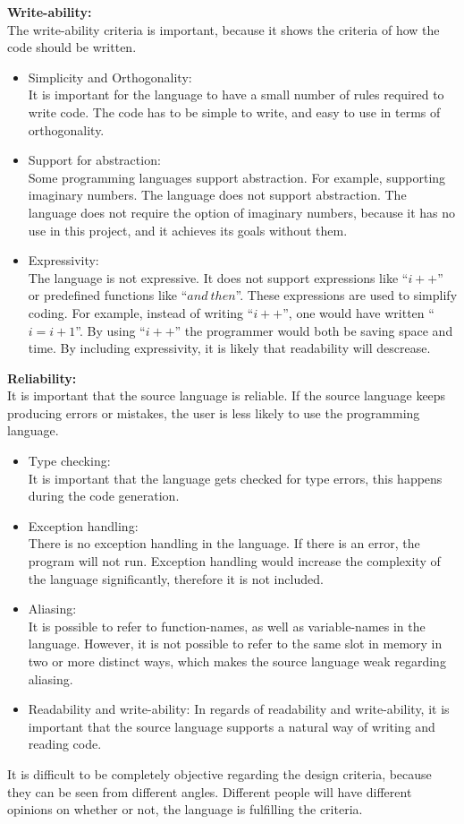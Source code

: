 \textbf{Write-ability:} \\
The write-ability criteria is important, because it shows the criteria of how the code should be written. 
\begin{itemize}
\item Simplicity and Orthogonality: \\
It is important for the language to have a small number of rules required to write code. The code has to be simple to write, and easy to use in terms of orthogonality.
\item Support for abstraction: \\
Some programming languages support abstraction. For example, supporting imaginary numbers. The language does not support abstraction. The language does not require the option of imaginary numbers, because it has no use in this project, and it achieves its goals without them.
\item Expressivity: \\
The language is not expressive. It does not support expressions like ``$i++$'' or predefined functions like ``$and~then$''. These expressions are used to simplify coding. For example, instead of writing ``$i++$'', one would have written ``$i = i + 1$''. By using ``$i++$'' the programmer would both be saving space and time. By including expressivity, it is likely that readability will descrease. 
\end{itemize}
\textbf{Reliability:} \\
It is important that the source language is reliable. If the source language keeps producing errors or mistakes, the user is less likely to use the programming language.
\begin{itemize}
\item Type checking: \\
It is important that the language gets checked for type errors, this happens during the code generation.
\item Exception handling: \\
There is no exception handling in the language. If there is an error, the program will not run. Exception handling would increase the complexity of the language significantly, therefore it is not included.
\item Aliasing: \\
It is possible to refer to function-names, as well as variable-names in the language. However, it is not possible to refer to the same slot in memory in two or more distinct ways, which makes the source language weak regarding aliasing. 
\item Readability and write-ability:
In regards of readability and write-ability, it is important that the source language supports a natural way of writing and reading code. 
\end{itemize}
It is difficult to be completely objective regarding the design criteria, because they can be seen from different angles. Different people will have different opinions on whether or not, the language is fulfilling the criteria. 